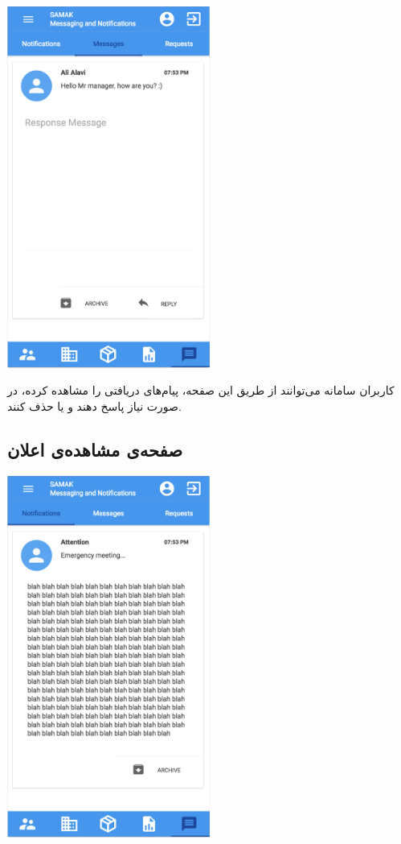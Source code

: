 \begin{center}
\includegraphics[width = 0.5\textwidth]{images/18-view-message.png}
\end{center}

کاربران سامانه می‌توانند از طریق این صفحه، پیام‌های دریافتی را مشاهده کرده، در صورت نیاز پاسخ دهند و یا حذف کنند.


\subsection{صفحه‌ی مشاهده‌ی اعلان}

\begin{center}
\includegraphics[width = 0.5\textwidth]{images/19-view-announcement.png}
\end{center}

